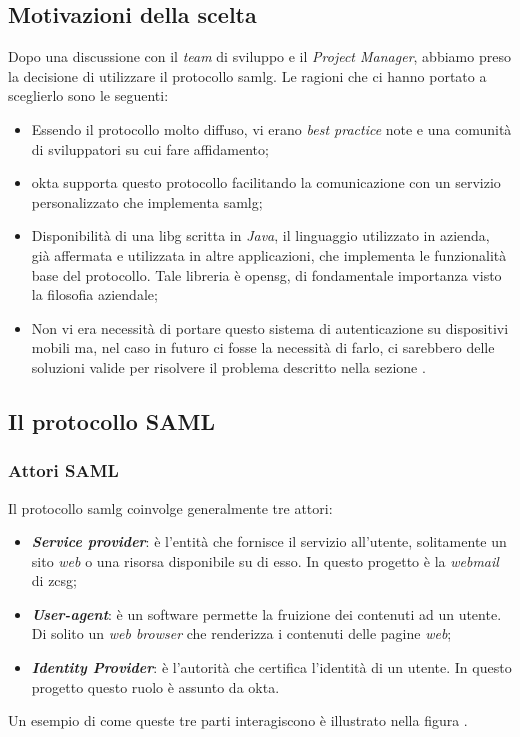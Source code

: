 \subsection{Motivazioni della scelta}
Dopo una discussione con il \textit{team} di sviluppo e il \textit{Project Manager}, abbiamo preso la decisione di utilizzare il protocollo \gls{samlg}. Le ragioni che ci hanno portato a sceglierlo sono le seguenti:
\begin{itemize}
    \item Essendo il protocollo molto diffuso, vi erano \textit{best practice} note e una comunità di sviluppatori su cui fare affidamento;
    \item \gls{okta} supporta questo protocollo facilitando la comunicazione con un servizio personalizzato che implementa \gls{samlg};
    \item Disponibilità di una \gls{libg} scritta in \textit{Java}, il linguaggio utilizzato in azienda, già affermata e utilizzata in altre applicazioni, che implementa le funzionalità base del protocollo. Tale libreria è \gls{opensg}, di fondamentale importanza visto la filosofia aziendale;
    \item Non vi era necessità di portare questo sistema di autenticazione su dispositivi mobili ma, nel caso in futuro ci fosse la necessità di farlo, ci sarebbero delle soluzioni valide per risolvere il problema descritto nella sezione .
\end{itemize}

\subsection{Il protocollo SAML}
\subsubsection{Attori SAML}
Il protocollo \gls{samlg} coinvolge generalmente tre attori:
\begin{itemize}
    \item \textit{\textbf{Service provider}}: è l'entità che fornisce il servizio all'utente, solitamente un sito \textit{web} o una risorsa disponibile su di esso. In questo progetto è la \textit{webmail} di \gls{zcsg};
    \item \textit{\textbf{User-agent}}: è un software permette la fruizione dei contenuti ad un utente. Di solito un \textit{web browser} che renderizza i contenuti delle pagine \textit{web};
    \item \textit{\textbf{Identity Provider}}: è l'autorità che certifica l'identità di un utente. In questo progetto questo ruolo è assunto da \gls{okta}.
\end{itemize}
Un esempio di come queste tre parti interagiscono è illustrato nella figura .
